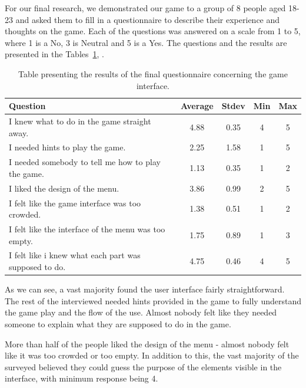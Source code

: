 For our final research, we demonstrated our game to a group of 8 people aged 18-23 and asked them to fill in a questionnaire to describe their experience and thoughts on the game. Each of the questions was answered on a scale from 1 to 5, where 1 is a No,  3 is Neutral and 5 is a Yes. The questions and the results are presented in the Tables~\ref{table:finalquestionsinterface}, .

\begin{table}
\begin{center}
\begin{tabular}{| p{8cm} | c | c | c | c | } 																	  \hline 
 \textbf{Question} & \textbf{Average} & \textbf{Stdev} & \textbf{Min} & \textbf{Max } \\ \hline \hline
 I knew what to do in the game straight away. 				& 4.88 & 0.35 & 4 & 5		   \\ \hline 
 I needed hints to play the game. 								& 2.25 & 1.58 & 1 & 5 	   \\ \hline 
 I needed somebody to tell me how to play the game. 	& 1.13 & 0.35 & 1 & 2  	   \\ \hline 
 I liked the design of the menu. 									& 3.86 & 0.99 & 2 & 5   	   \\ \hline 
 I felt like the game interface was too crowded. 				& 1.38 & 0.51 & 1 & 2 	   \\ \hline 
 I felt like the interface of the menu was too empty.		& 1.75 & 0.89 & 1 & 3		   \\ \hline
 I felt like i knew what each part was supposed to do. 	& 4.75 & 0.46 & 4 & 5		   \\ \hline
\end{tabular}
\caption{Table presenting the results of the final questionnaire concerning the game interface.}
\label{table:finalquestionsinterface}
\end{center}
\end{table}

As we can see, a vast majority found the user interface fairly straightforward. The rest of the interviewed needed hints provided in the game to fully understand the game play and the flow of the use. Almost nobody felt like they needed someone to explain what they are supposed to do in the game. 

More than half of the people liked the design of the menu - almost nobody felt like it was too crowded or too empty. In addition to this, the vast majority of the surveyed believed they could guess the purpose of the elements visible in the interface, with minimum response being 4.

